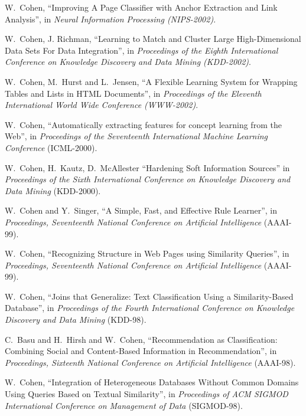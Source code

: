 \item[2002] W.~Cohen,
	``Improving A Page Classifier with Anchor Extraction and Link
	Analysis'', in {\em Neural Information Processing
	(NIPS-2002)}.

\item[2002] W.~Cohen, J. Richman, 
	``Learning to Match and Cluster Large High-Dimensional Data
	Sets For Data Integration'', in {\em Proceedings of
	the Eighth International Conference on Knowledge Discovery and
	Data Mining (KDD-2002)}.

\item[2002] W.~Cohen,  M.~Hurst and L.~Jensen, 
	``A Flexible Learning System for Wrapping Tables and Lists in
	HTML Documents'', in {\em Proceedings of the Eleventh
	International World Wide Conference (WWW-2002)}.

\item[2000] W.~Cohen, ``Automatically extracting features for concept learning from the Web'',
	in {\em Proceedings of the Seventeenth International Machine Learning
	Conference} (ICML-2000). 

\item[2000] W.~Cohen, H.~Kautz, D.~McAllester ``Hardening Soft 
	Information Sources'' in {\em Proceedings of the Sixth
	International Conference on Knowledge Discovery and Data Mining}
	(KDD-2000).

\item[1999] W.~Cohen and Y.~Singer, ``A Simple, Fast, and Effective
	Rule Learner'', in {\em Proceedings, 
	Seventeenth National Conference on
	Artificial Intelligence} (AAAI-99).

\item[1999] W.~Cohen, ``Recognizing Structure in Web Pages using Similarity Queries'', 
	in {\em Proceedings, Seventeenth National Conference on
	Artificial Intelligence} (AAAI-99).

\item[1998] W.~Cohen, ``Joins that Generalize: Text Classification
	Using a Similarity-Based Database'', in {\em Proceedings of the Fourth
	International Conference on Knowledge Discovery and Data Mining}
	(KDD-98).

\item[1998] C.~Basu and H.~Hirsh and W.~Cohen, ``Recommendation as
		Classification: Combining Social and Content-Based Information in
		Recommendation'', in 
		{\em Proceedings, 
		Sixteenth National Conference on
		Artificial Intelligence} (AAAI-98).

\item[1998] W.~Cohen, ``Integration of Heterogeneous Databases Without
		Common Domains Using Queries Based on Textual Similarity'',
		in {\em Proceedings of ACM SIGMOD International Conference
		on Management of Data} (SIGMOD-98).

